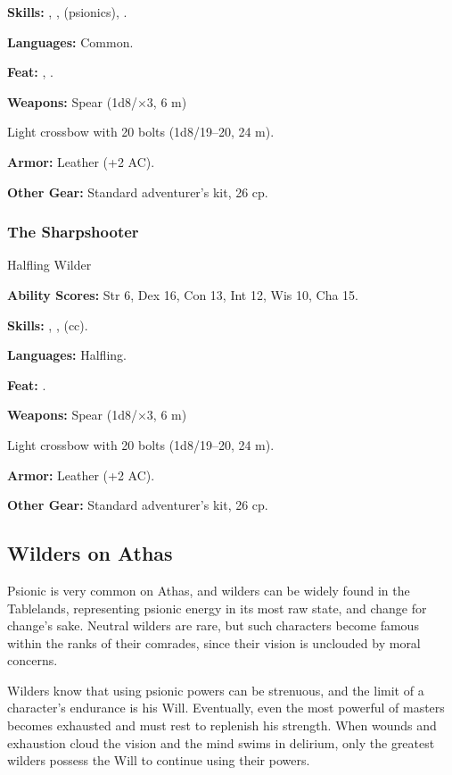\textbf{Skills:} , ,  (psionics), .

\textbf{Languages:} Common.

\textbf{Feat:} , .

\textbf{Weapons:} Spear (1d8/$\times$3, 6 m)

Light crossbow with 20 bolts (1d8/19--20, 24 m).

\textbf{Armor:} Leather (+2 AC).

\textbf{Other Gear:} Standard adventurer's kit, 26 cp.

\vskip3cm
\subsubsection{The Sharpshooter}
Halfling Wilder

\textbf{Ability Scores:} Str 6, Dex 16, Con 13, Int 12, Wis 10, Cha 15.

\textbf{Skills:} , ,  (cc).

\textbf{Languages:} Halfling.

\textbf{Feat:} .

\textbf{Weapons:} Spear (1d8/$\times$3, 6 m)

Light crossbow with 20 bolts (1d8/19--20, 24 m).

\textbf{Armor:} Leather (+2 AC).

\textbf{Other Gear:} Standard adventurer's kit, 26 cp.

\subsection{Wilders on Athas}

Psionic is very common on Athas, and wilders can be widely found in the Tablelands, representing psionic energy in its most raw state, and change for change's sake. Neutral wilders are rare, but such characters become famous within the ranks of their comrades, since their vision is unclouded by moral concerns.

Wilders know that using psionic powers can be strenuous, and the limit of a character's endurance is his Will. Eventually, even the most powerful of masters becomes exhausted and must rest to replenish his strength. When wounds and exhaustion cloud the vision and the mind swims in delirium, only the greatest wilders possess the Will to continue using their powers.

